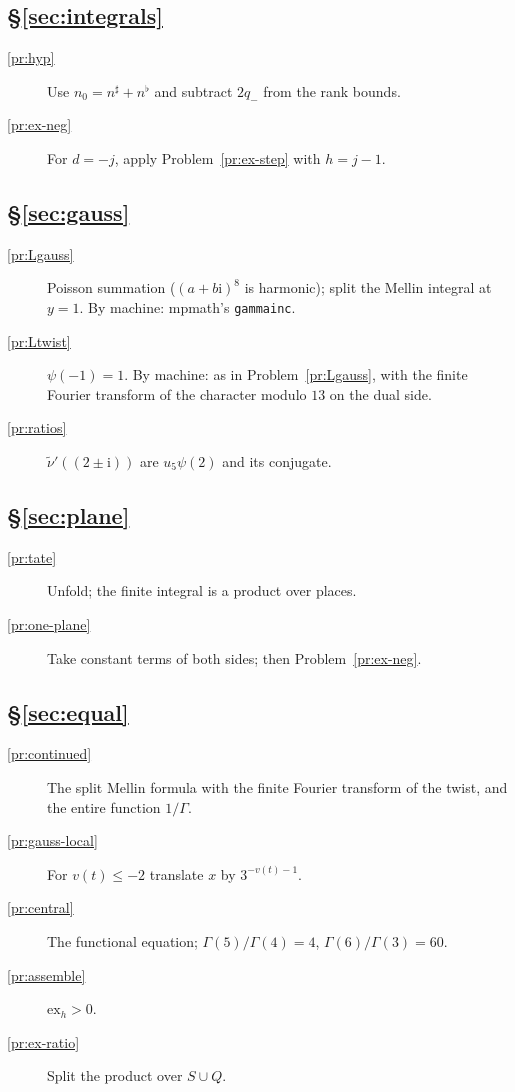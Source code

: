 \documentclass[reqno]{amsart}
\theoremstyle{definition}
\theoremstyle{plain}
\newcommand{\ex}{\mathrm{ex}}
\newcommand{\ns}{n^\sharp}
\newcommand{\nb}{n^\flat}
\newcommand{\ii}{\mathrm{i}}
\newcommand{\tl}[1]{\texttt{#1}}
\begin{document}
\subsection*{\S\ref{sec:integrals}}
\begin{description}
\item[\ref{pr:hyp}] Use \(n_0 = \ns + \nb\) and subtract \(2q_-\) from the rank bounds.
\item[\ref{pr:ex-neg}] For \(d = -j\), apply Problem~\ref{pr:ex-step} with \(h = j - 1\).
\end{description}

\subsection*{\S\ref{sec:gauss}}
\begin{description}
\item[\ref{pr:Lgauss}] Poisson summation (\((a+b\ii)^8\) is harmonic); split the Mellin integral at \(y = 1\).  By machine: mpmath's \tl{gammainc}.
\item[\ref{pr:Ltwist}] \(\psi(-1) = 1\).  By machine: as in Problem~\ref{pr:Lgauss}, with the finite Fourier transform of the character modulo \(13\) on the dual side.
\item[\ref{pr:ratios}] \(\tilde\nu'((2 \pm \ii))\) are \(u_5\psi(2)\) and its conjugate.
\end{description}

\subsection*{\S\ref{sec:plane}}
\begin{description}
\item[\ref{pr:tate}] Unfold; the finite integral is a product over places.
\item[\ref{pr:one-plane}] Take constant terms of both sides; then Problem~\ref{pr:ex-neg}.
\end{description}

\subsection*{\S\ref{sec:equal}}
\begin{description}
\item[\ref{pr:continued}] The split Mellin formula with the finite Fourier transform of the twist, and the entire function \(1/\Gamma\).
\item[\ref{pr:gauss-local}] For \(v(t) \le -2\) translate \(x\) by \(3^{-v(t)-1}\).
\item[\ref{pr:central}] The functional equation; \(\Gamma(5)/\Gamma(4) = 4\), \(\Gamma(6)/\Gamma(3) = 60\).
\item[\ref{pr:assemble}] \(\ex_h > 0\).
\item[\ref{pr:ex-ratio}] Split the product over \(S \cup Q\).
\end{description}
\end{document}
